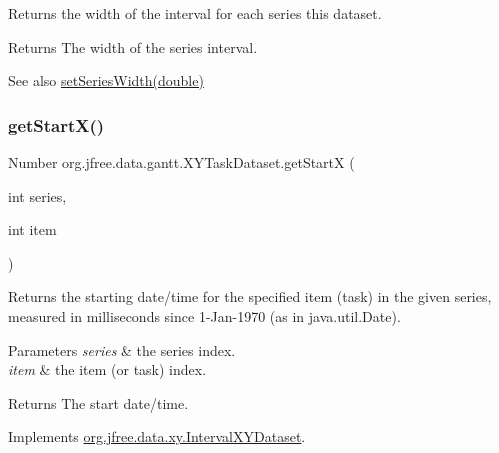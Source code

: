 Returns the width of the interval for each series this dataset.

\begin{DoxyReturn}{Returns}
The width of the series interval.
\end{DoxyReturn}
\begin{DoxySeeAlso}{See also}
\mbox{\hyperlink{classorg_1_1jfree_1_1data_1_1gantt_1_1_x_y_task_dataset_a8d2f868d7f2cba834f06f2e54131ede4}{set\+Series\+Width(double)}} 
\end{DoxySeeAlso}
\mbox{\label{classorg_1_1jfree_1_1data_1_1gantt_1_1_x_y_task_dataset_afd4c9a195a8fd2699ed927b6c4f717c4}} 
\subsubsection{\texorpdfstring{get\+Start\+X()}{getStartX()}}
{\footnotesize\ttfamily Number org.\+jfree.\+data.\+gantt.\+X\+Y\+Task\+Dataset.\+get\+StartX (\begin{DoxyParamCaption}\item[{int}]{series,  }\item[{int}]{item }\end{DoxyParamCaption})}

Returns the starting date/time for the specified item (task) in the given series, measured in milliseconds since 1-\/\+Jan-\/1970 (as in java.\+util.\+Date).


\begin{DoxyParams}{Parameters}
{\em series} & the series index. \\
\hline
{\em item} & the item (or task) index.\\
\hline
\end{DoxyParams}
\begin{DoxyReturn}{Returns}
The start date/time. 
\end{DoxyReturn}


Implements \mbox{\hyperlink{interfaceorg_1_1jfree_1_1data_1_1xy_1_1_interval_x_y_dataset_a7548ec7d60d72463313dc6f10aceee62}{org.\+jfree.\+data.\+xy.\+Interval\+X\+Y\+Dataset}}.

\mbox{\label{classorg_1_1jfree_1_1data_1_1gantt_1_1_x_y_task_dataset_a142d508701d22e9653c03b99ab29be4a}} 
